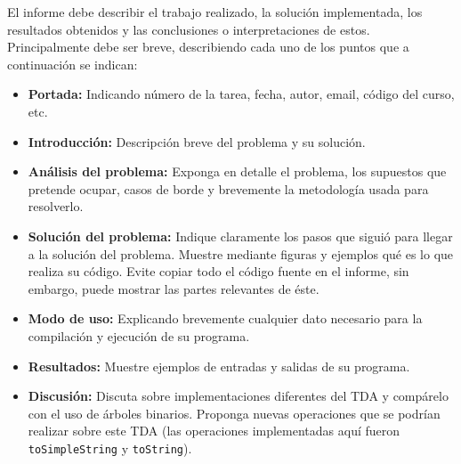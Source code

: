 \documentclass[dcc]{fcfmcourse}
\begin{document}
El informe debe describir el trabajo realizado, la solución implementada, los resultados obtenidos
y las conclusiones o interpretaciones de estos. Principalmente debe ser breve, describiendo cada uno
de los puntos que a continuación se indican:

\begin{itemize}
    \item \textbf{Portada:} Indicando número de la tarea, fecha, autor, email, código del curso, etc.
    \item \textbf{Introducción:} Descripción breve del problema y su solución.
    \item \textbf{Análisis del problema:} Exponga en detalle el problema, los supuestos que pretende ocupar, casos de borde y brevemente la metodología usada para resolverlo.
    \item \textbf{Solución del problema:} Indique claramente los pasos que siguió para llegar a la solución
del problema. Muestre mediante figuras y ejemplos qué es lo que realiza su código. Evite
copiar todo el código fuente en el informe, sin embargo, puede mostrar las partes relevantes
de éste.
\item \textbf{Modo de uso:} Explicando brevemente cualquier dato necesario para la compilación y
ejecución de su programa.
\item \textbf{Resultados:} Muestre ejemplos de entradas y salidas de su programa.
\item \textbf{Discusión:} Discuta sobre implementaciones diferentes del TDA y compárelo con el uso de árboles binarios. Proponga nuevas operaciones que se podrían realizar sobre este TDA (las operaciones implementadas aquí fueron \texttt{toSimpleString} y \texttt{toString}).
\end{itemize}
\end{document}
